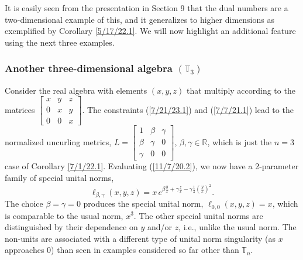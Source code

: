 \documentclass{amsart}
\numberwithin{equation}{section}
\theoremstyle{definition}
\numberwithin{theorem}{section}
\begin{document}
It is easily seen from the presentation in Section 9 that the dual numbers are a two-dimensional example of this, and it
generalizes to higher dimensions as exemplified by Corollary \ref{5/17/22.1}.  We will now highlight an additional feature using the next three examples.  

\subsubsection{Another three-dimensional algebra $(\mathbb{T}_3)$}Consider the real algebra with elements  $(x,y,z)$ that multiply according to the matrices $ \left[
\begin{array}{ccc}
x & y & z   \\
0 & x & y \\
0 & 0 & x  
\end{array}
\right]$.    The constraints (\ref{7/21/23.1}) and (\ref{7/7/21.1}) lead to the normalized uncurling metrics, $ L = \left[
\begin{array}{ccc}
1 & \beta & \gamma   \\
\beta & \gamma & 0 \\
\gamma & 0 & 0  
\end{array}
\right]$, $\beta,\gamma\in\mathbb{R}$, which is just the $n=3$ case of Corollary \ref{7/1/22.1}.    Evaluating (\ref{11/7/20.2}), we now have a 2-parameter family of special unital norms, \begin{equation}\label{3/31/21.3} \ell_{\beta,\gamma}(x,y,z) = x\, e^{ \beta\frac{y}{x}  +\gamma \frac{z}{x} -\gamma \frac{ 1}{2}\left(\frac{y}{x}\right)^2 }.\end{equation}    The choice $\beta = \gamma = 0$ produces the special unital norm, $\ell_{0,0}(x,y,z)= x$, which is comparable to the usual norm, $x^3$.  
 The other special unital norms are distinguished by their dependence on $y$ and/or $z$, i.e., unlike the usual norm.  The non-units are associated with a different type of unital norm singularity (as $x$ approaches 0) than seen in examples considered so far other than $\mathbb{T}_n$.
 
 
\end{document}

